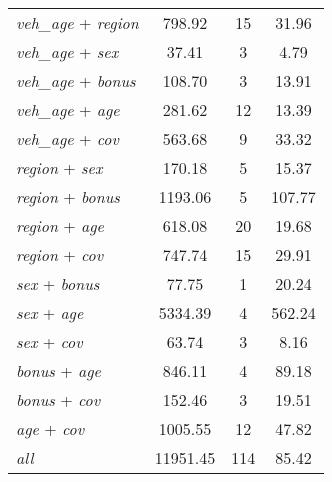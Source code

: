{\begin{ThreePartTable}
\begin{longtable}{lccc}
    \textit{veh\_age} + \textit{region} &   798.92 &       15 &    31.96 \\
    \textit{veh\_age} + \textit{sex} &    37.41 &        3 &     4.79 \\
    \textit{veh\_age} + \textit{bonus} &   108.70 &        3 &    13.91 \\
    \textit{veh\_age} + \textit{age} &   281.62 &       12 &    13.39 \\
    \textit{veh\_age} + \textit{cov} &   563.68 &        9 &    33.32 \\
    \textit{region} + \textit{sex} &   170.18 &        5 &    15.37 \\
    \textit{region} + \textit{bonus} &  1193.06 &        5 &   107.77 \\
    \textit{region} + \textit{age} &   618.08 &       20 &    19.68 \\
    \textit{region} + \textit{cov} &   747.74 &       15 &    29.91 \\
    \textit{sex} + \textit{bonus} &    77.75 &        1 &    20.24 \\
    \textit{sex} + \textit{age} &  5334.39 &        4 &   562.24 \\
    \textit{sex} + \textit{cov} &    63.74 &        3 &     8.16 \\
    \textit{bonus} + \textit{age} &   846.11 &        4 &    89.18 \\
    \textit{bonus} + \textit{cov} &   152.46 &        3 &    19.51 \\
    \textit{age} + \textit{cov} &  1005.55 &       12 &    47.82 \\
    \textit{all}\tnote{\ddag} & 11951.45 &      114 &    85.42 \\

\end{longtable}
\end{ThreePartTable}
}
